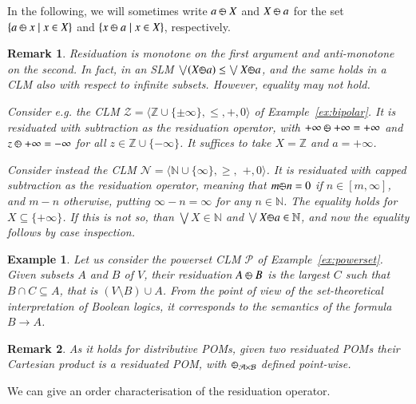 \documentclass[a4paper]{elsarticle}
\newtheorem{example}{Example}
\newtheorem{remark}{Remark}
\newcommand{\1}{\mathbf{1}}
\def\odiv{{ \ominus\hspace{-8pt}:}\;}
\begin{document}
In the following, we will sometimes write $a \mathbin{\odiv} X$ and $X \mathbin{\odiv}  a$
for the set  $\{a \mathbin{\odiv}  x \mid x \in X\}$ and  $\{x \mathbin{\odiv}  a \mid x \in X\}$,
respectively.

\begin{remark}\label{inverse}
	Residuation is monotone on the first argument and
	anti-monotone on the second. In fact, in an SLM 
	$\bigvee (X \odiv a) \leq \bigvee X \odiv a$,
	and the same holds in a CLM also with respect to infinite subsets.
	However, equality may not hold.

	Consider e.g. the CLM $\mathcal{Z} = \langle \mathbb{Z} \cup \{\pm \infty\}, \leq, +, 0 \rangle$
	of Example~\ref{ex:bipolar}. It is residuated with subtraction as the residuation operator,
	with ${+}\infty \mathbin{\odiv} {+}\infty = {+}\infty$ and  $z \mathbin{\odiv} {+}\infty =  {-}\infty$ for all $z \in  \mathbb{Z} \cup \{{-}\infty\}$.
	It suffices to take $X = \mathbb{Z}$ and $a = {+}\infty$.

	Consider instead the CLM  
	$\mathcal{N} = \langle \mathbb{N} \cup \{\infty\}, \geq,$ $+, 0 \rangle$.
	It is residuated with capped subtraction as the residuation operator,
	meaning that $m \odiv n = 0$ if $n \in [m, \infty]$, and $m - n$ otherwise,
	putting $\infty - n = \infty$ for any $n \in \mathbb{N}$.
%
	The equality holds for $X \subseteq \{{+}\infty\}$. If this is not so, than 
	$\bigvee X \in \mathbb{N}$ and $\bigvee X \odiv a \in \mathbb{N}$,
	and now the equality follows by case inspection.
\end{remark}

\begin{example}
\label{setCLM}
Let us consider the powerset CLM $\mathcal{P}$ of Example~\ref{ex:powerset}. 
Given subsets $A$ and $B$ of $V$, their residuation $A \mathbin{\odiv} B$ 
is the largest $C$ such that $B \cap C \subseteq A$, that is $(V \setminus B) \cup A$. From the point of view
of the set-theoretical interpretation of Boolean logics, it corresponds to the semantics of the formula $B \rightarrow A$.
\end{example}

\begin{remark}
	\label{remarkC}
	As it holds for distributive POMs, given two residuated POMs their Cartesian product
	is a residuated POM, with $\odiv_{\mathcal{A} \times \mathcal{B}}$ defined point-wise.
\end{remark}

We can give an order characterisation of the residuation operator.
\end{document}
